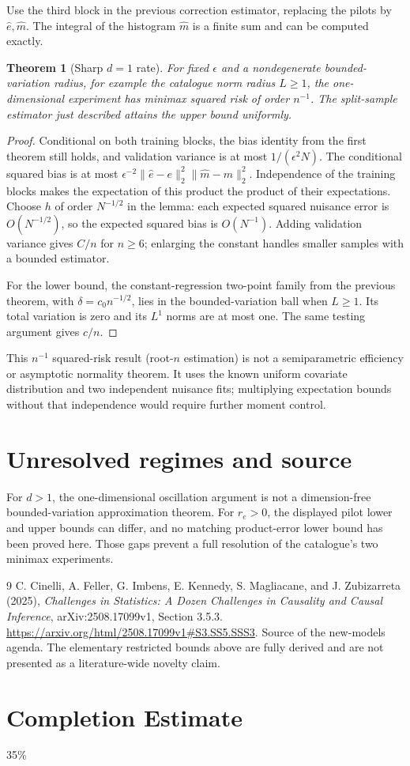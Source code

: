 \documentclass[11pt,a4paper]{article}
\newtheorem{theorem}{Theorem}[section]
\theoremstyle{definition}
\theoremstyle{remark}
\begin{document}
Use the third block in the previous correction estimator, replacing the pilots by $\widehat e,\widehat m$. The integral of the histogram $\widehat m$ is a finite sum and can be computed exactly.
\begin{theorem}[Sharp $d=1$ rate]
For fixed $\epsilon$ and a nondegenerate bounded-variation radius, for example the catalogue norm radius $L\ge1$, the one-dimensional experiment has minimax squared risk of order $n^{-1}$. The split-sample estimator just described attains the upper bound uniformly.
\end{theorem}
\begin{proof}
Conditional on both training blocks, the bias identity from the first theorem still holds, and validation variance is at most $1/(\epsilon^2N)$. The conditional squared bias is at most
$\epsilon^{-2}\|\widehat e-e\|_2^2\|\widehat m-m\|_2^2$.
Independence of the training blocks makes the expectation of this product the product of their expectations. Choose $h$ of order $N^{-1/2}$ in the lemma: each expected squared nuisance error is $O(N^{-1/2})$, so the expected squared bias is $O(N^{-1})$. Adding validation variance gives $C/n$ for $n\ge6$; enlarging the constant handles smaller samples with a bounded estimator.

For the lower bound, the constant-regression two-point family from the previous theorem, with $\delta=c_0n^{-1/2}$, lies in the bounded-variation ball when $L\ge1$. Its total variation is zero and its $L^1$ norms are at most one. The same testing argument gives $c/n$.
\end{proof}
This $n^{-1}$ squared-risk result (root-$n$ estimation) is not a semiparametric efficiency or asymptotic normality theorem. It uses the known uniform covariate distribution and two independent nuisance fits; multiplying expectation bounds without that independence would require further moment control.
\section{Unresolved regimes and source}
For $d>1$, the one-dimensional oscillation argument is not a dimension-free bounded-variation approximation theorem. For $r_e>0$, the displayed pilot lower and upper bounds can differ, and no matching product-error lower bound has been proved here. Those gaps prevent a full resolution of the catalogue's two minimax experiments.
\begin{thebibliography}{9}
 C. Cinelli, A. Feller, G. Imbens, E. Kennedy, S. Magliacane, and J. Zubizarreta (2025), \emph{Challenges in Statistics: A Dozen Challenges in Causality and Causal Inference}, arXiv:2508.17099v1, Section 3.5.3. \url{https://arxiv.org/html/2508.17099v1#S3.SS5.SSS3}. Source of the new-models agenda. The elementary restricted bounds above are fully derived and are not presented as a literature-wide novelty claim.
\end{thebibliography}

\section{Completion Estimate}
35\%
\end{document}
